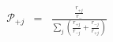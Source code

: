 \begin{eqnarray}
{\mathcal P}_{+j}  & = & \frac{\frac{r_{+j}}{r_{-}}}{\sum_j\left(\frac{r_{+j}}{r_{-j}} + \frac{r_{-j}}{r_{+j}}  \right)} \\
\end{eqnarray}